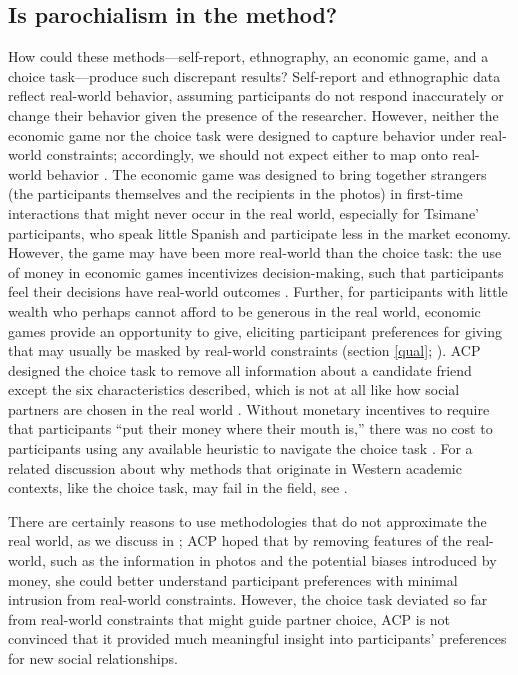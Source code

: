 \documentclass[bibauthoryear]{aa}
\begin{document}
	\subsection{Is parochialism in the method?}
How could these methods---self-report, ethnography, an economic game, and a choice task---produce such discrepant results? Self-report and ethnographic data reflect real-world behavior, assuming participants do not respond inaccurately or change their behavior given the presence of the researcher. However, neither the economic game nor the choice task were designed to capture behavior under real-world constraints; accordingly, we should not expect either to map onto real-world behavior \citep{Pisor2020, gurven2008collective, Naar2020}. The economic game was designed to bring together strangers (the participants themselves and the recipients in the photos) in first-time interactions that might never occur in the real world, especially for Tsimane' participants, who speak little Spanish and participate less in the market economy. However, the game may have been more real-world than the choice task: the use of money in economic games incentivizes decision-making, such that participants feel their decisions have real-world outcomes \citep{guala2005methodology}. Further, for participants with little wealth who perhaps cannot afford to be generous in the real world, economic games provide an opportunity to give, eliciting participant preferences for giving that may usually be masked by real-world constraints (section \ref{qual}; \citep{Pisor2020}). ACP designed the choice task to remove all information about a candidate friend except the six characteristics described, which is not at all like how social partners are chosen in the real world \citep[see][for a relevant review]{barclay2013strategies}. Without monetary incentives to require that participants ``put their money where their mouth is,'' there was no cost to participants using any available  heuristic to navigate the choice task \citep{Pisor2020, xygalatasreligious}. For a related discussion about why methods that originate in Western academic contexts, like the choice task, may fail in the field, see \citet{hruschka2018learning}.

There are certainly reasons to use methodologies that do not approximate the real world, as we discuss in \citet{Pisor2020}; ACP hoped that by removing features of the real-world, such as the information in photos and the potential biases introduced by money, she could better understand participant preferences with minimal intrusion from real-world constraints. However, the choice task deviated so far from real-world constraints that might guide partner choice, ACP is not convinced that it provided much meaningful insight into participants' preferences for new social relationships.
\end{document}

